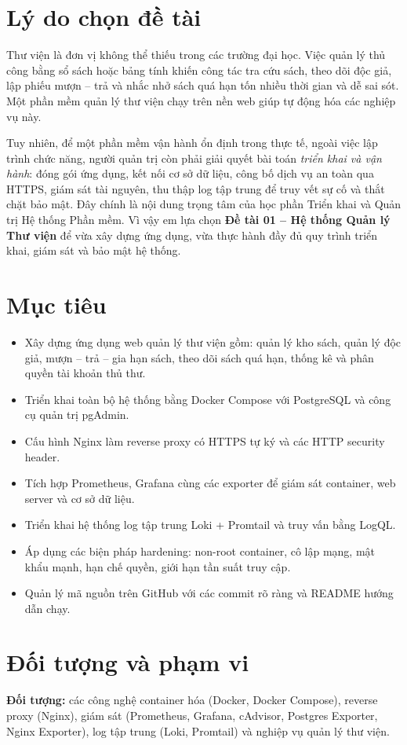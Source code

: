 \documentclass[../main.tex]{subfiles}
\begin{document}
\section*{Lý do chọn đề tài}
Thư viện là đơn vị không thể thiếu trong các trường đại học. Việc quản lý thủ công bằng sổ sách hoặc bảng tính khiến công tác tra cứu sách, theo dõi độc giả, lập phiếu mượn -- trả và nhắc nhở sách quá hạn tốn nhiều thời gian và dễ sai sót. Một phần mềm quản lý thư viện chạy trên nền web giúp tự động hóa các nghiệp vụ này.

Tuy nhiên, để một phần mềm vận hành ổn định trong thực tế, ngoài việc lập trình chức năng, người quản trị còn phải giải quyết bài toán \textit{triển khai và vận hành}: đóng gói ứng dụng, kết nối cơ sở dữ liệu, công bố dịch vụ an toàn qua HTTPS, giám sát tài nguyên, thu thập log tập trung để truy vết sự cố và thắt chặt bảo mật. Đây chính là nội dung trọng tâm của học phần Triển khai và Quản trị Hệ thống Phần mềm. Vì vậy em lựa chọn \textbf{Đề tài 01 -- Hệ thống Quản lý Thư viện} để vừa xây dựng ứng dụng, vừa thực hành đầy đủ quy trình triển khai, giám sát và bảo mật hệ thống.

\section*{Mục tiêu}
\begin{itemize}
    \item Xây dựng ứng dụng web quản lý thư viện gồm: quản lý kho sách, quản lý độc giả, mượn -- trả -- gia hạn sách, theo dõi sách quá hạn, thống kê và phân quyền tài khoản thủ thư.
    \item Triển khai toàn bộ hệ thống bằng Docker Compose với PostgreSQL và công cụ quản trị pgAdmin.
    \item Cấu hình Nginx làm reverse proxy có HTTPS tự ký và các HTTP security header.
    \item Tích hợp Prometheus, Grafana cùng các exporter để giám sát container, web server và cơ sở dữ liệu.
    \item Triển khai hệ thống log tập trung Loki + Promtail và truy vấn bằng LogQL.
    \item Áp dụng các biện pháp hardening: non-root container, cô lập mạng, mật khẩu mạnh, hạn chế quyền, giới hạn tần suất truy cập.
    \item Quản lý mã nguồn trên GitHub với các commit rõ ràng và README hướng dẫn chạy.
\end{itemize}

\section*{Đối tượng và phạm vi}
\textbf{Đối tượng:} các công nghệ container hóa (Docker, Docker Compose), reverse proxy (Nginx), giám sát (Prometheus, Grafana, cAdvisor, Postgres Exporter, Nginx Exporter), log tập trung (Loki, Promtail) và nghiệp vụ quản lý thư viện.
\end{document}
